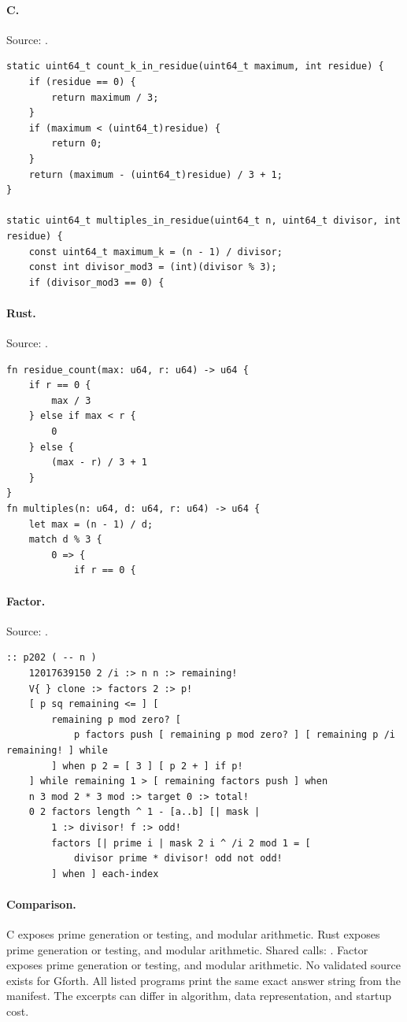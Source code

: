 \paragraph{C.} Source: .
\begin{lstlisting}
static uint64_t count_k_in_residue(uint64_t maximum, int residue) {
    if (residue == 0) {
        return maximum / 3;
    }
    if (maximum < (uint64_t)residue) {
        return 0;
    }
    return (maximum - (uint64_t)residue) / 3 + 1;
}

static uint64_t multiples_in_residue(uint64_t n, uint64_t divisor, int residue) {
    const uint64_t maximum_k = (n - 1) / divisor;
    const int divisor_mod3 = (int)(divisor % 3);
    if (divisor_mod3 == 0) {
\end{lstlisting}

\paragraph{Rust.} Source: .
\begin{lstlisting}
fn residue_count(max: u64, r: u64) -> u64 {
    if r == 0 {
        max / 3
    } else if max < r {
        0
    } else {
        (max - r) / 3 + 1
    }
}
fn multiples(n: u64, d: u64, r: u64) -> u64 {
    let max = (n - 1) / d;
    match d % 3 {
        0 => {
            if r == 0 {
\end{lstlisting}

\paragraph{Factor.} Source: .
\begin{lstlisting}
:: p202 ( -- n )
    12017639150 2 /i :> n n :> remaining!
    V{ } clone :> factors 2 :> p!
    [ p sq remaining <= ] [
        remaining p mod zero? [
            p factors push [ remaining p mod zero? ] [ remaining p /i remaining! ] while
        ] when p 2 = [ 3 ] [ p 2 + ] if p!
    ] while remaining 1 > [ remaining factors push ] when
    n 3 mod 2 * 3 mod :> target 0 :> total!
    0 2 factors length ^ 1 - [a..b] [| mask |
        1 :> divisor! f :> odd!
        factors [| prime i | mask 2 i ^ /i 2 mod 1 = [
            divisor prime * divisor! odd not odd!
        ] when ] each-index
\end{lstlisting}

\paragraph{Comparison.}
C exposes prime generation or testing, and modular arithmetic. Rust exposes prime generation or testing, and modular arithmetic. Shared calls: \texttt{}. Factor exposes prime generation or testing, and modular arithmetic.
No validated source exists for Gforth.
All listed programs print the same exact answer string from the manifest. The excerpts can differ in algorithm, data representation, and startup cost.

